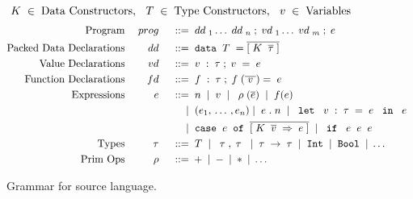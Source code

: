 \begin{figure*}
    \begin{displaymath}
    \; {K} \; \in \; \textup{Data Constructors}, \:\: \; {T} \; \in \; \textup{Type Constructors}, \:\: \; v \; \in \; \textup{Variables}
  \end{displaymath} 
  \begin{displaymath}
    \begin{aligned}
      \textup{Program} && \PROG && \gramdef & \DD_1 \ldots \DD_n \; ; \VD_1 \ldots \VD_m \; ; \EXPR \\
      \textup{Packed Data Declarations} && \DD && \gramdef & \DATA \TC = \overline{[\DC \; \overline{\sTYP}\;]} \\
      \textup{Value Declarations}    && \VD && \gramdef & \var : \TYP  ; \var = \EXPR \\ 
      \textup{Function Declarations} && \FD && \gramdef & \fvar : \TYP ; \fvar(\overline{\var}) = \EXPR \\ 
      \textup{Expressions} && \EXPR && \gramdef & \num \gramor \var \gramor \primexpr{\overline{\sEXPR}} \gramor 
       \app{f}{\sEXPR} \\
%
      && && \gramor & 
      \;(e_1,\, \dots\, , e_n) \gramor \EXPR.\num 
      \gramor \letexpr{\var:\TYP}{\EXPR}{\EXPR} \\
      && && \gramor & \case{\sEXPR}{\overline{[\bind{\DC \; \overline{\svar} \;}{\EXPR}]}} \gramor  \ife{\EXPR}{\EXPR}{\EXPR} \\
      \textup{Types} && \TYP && \gramdef &
      \TC \gramor \pairtype{\TYP}{\TYP} \gramor \TYP \ARROW \TYP
      \gramor \gramwd{Int} \gramor \gramwd{Bool} \gramor \dots
      \\
      \textup{Prim Ops} && \PRIM && \gramdef & + \gramor - \gramor * \gramor \ldots \\
    \end{aligned}
  \end{displaymath}
  \caption{Grammar for source language.}
  \label{fig:source}
\end{figure*}

